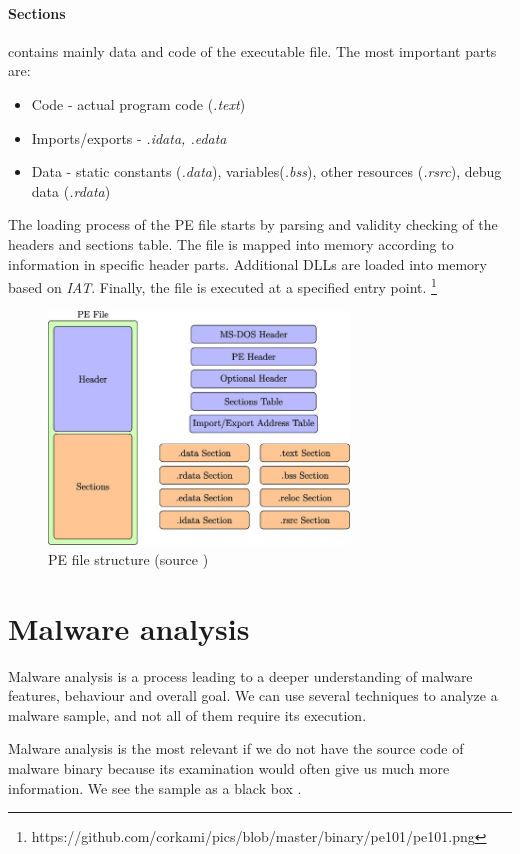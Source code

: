\paragraph{Sections} contains mainly data and code of the executable file. The most important parts are:
\begin{itemize}
  \item Code - actual program code (\emph{.text})
  \item Imports/exports - \emph{.idata, .edata}
  \item Data - static constants (\emph{.data}), variables(\emph{.bss}), other resources (\emph{.rsrc}), debug data (\emph{.rdata})
\end{itemize}

The loading process of the PE file starts by parsing and validity checking of the headers and sections table. The file is mapped into memory according to information in specific header parts. Additional DLLs are loaded into memory based on \emph{IAT}. Finally, the file is executed at a specified entry point. \footnote{https://github.com/corkami/pics/blob/master/binary/pe101/pe101.png}

\begin{figure}[h]
  \centering
  \includegraphics[width=8cm]{figures/pe.jpg}
  \caption{PE file structure (source \cite{Gibert2020})}
  \label{fig:pe}
\end{figure}

\section{Malware analysis}
Malware analysis is a process leading to a deeper understanding of malware features, behaviour and overall goal. We can use several techniques to analyze a malware sample, and not all of them require its execution.

Malware analysis is the most relevant if we do not have the source code of malware binary because its examination would often give us much more information. We see the sample as a black box \cite{Sikorski2012}.

